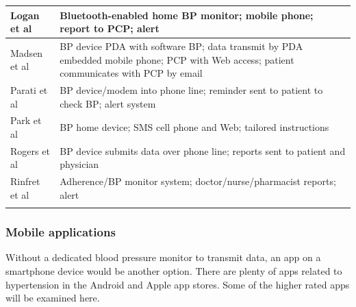 \documentclass[11pt]{article}
\begin{document}
\begin{center}
\begin{tabular}{|p{3cm}|p{15cm}|}
Logan et al\cite{Im10}    & Bluetooth-enabled home BP monitor; mobile phone; report to PCP; alert                                                                                                      \\ \hline
Madsen et al\cite{Im11}   & BP device PDA with software BP; data transmit by PDA embedded mobile phone; PCP with Web access; patient communicates with PCP by email                                 \\ \hline
Parati et al\cite{Im12}   & BP device/modem into phone line; reminder sent to patient to check BP; alert system                                                                                        \\ \hline
Park et al\cite{Im13}     & BP home device; SMS cell phone and Web; tailored instructions                                                                                                              \\ \hline
Rogers et al\cite{Im14}   & BP device submits data over phone line; reports sent to patient and physician                                                                                              \\ \hline
Rinfret et al\cite{Im15}  & Adherence/BP monitor system; doctor/nurse/pharmacist reports; alert                                                                                                        \\ \hline
\label{table:TMtechs}
\end{tabular}
\end{center}
\newpage


\subsubsection{Mobile applications}
Without a dedicated blood pressure monitor to transmit data, an app on a smartphone device would be another option.  There are plenty of apps related to hypertension in the Android and Apple app stores.  Some of the higher rated apps will be examined here. 
\end{document}
